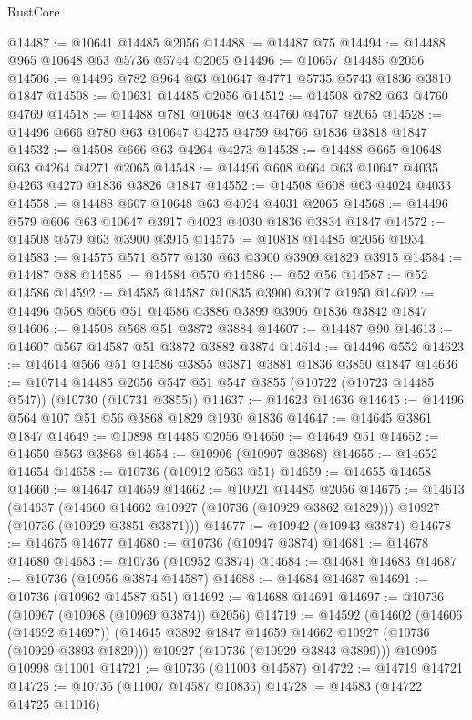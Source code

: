 \begin{lexlean}{RustCore}
\begin{coremodule}
@14487 := @10641 @14485 @2056
@14488 := @14487 @75
@14494 := @14488 @965 @10648 @63 @5736 @5744 @2065
@14496 := @10657 @14485 @2056
@14506 := @14496 @782 @964 @63 @10647 @4771 @5735 @5743 @1836 @3810 @1847
@14508 := @10631 @14485 @2056
@14512 := @14508 @782 @63 @4760 @4769
@14518 := @14488 @781 @10648 @63 @4760 @4767 @2065
@14528 := @14496 @666 @780 @63 @10647 @4275 @4759 @4766 @1836 @3818 @1847
@14532 := @14508 @666 @63 @4264 @4273
@14538 := @14488 @665 @10648 @63 @4264 @4271 @2065
@14548 := @14496 @608 @664 @63 @10647 @4035 @4263 @4270 @1836 @3826 @1847
@14552 := @14508 @608 @63 @4024 @4033
@14558 := @14488 @607 @10648 @63 @4024 @4031 @2065
@14568 := @14496 @579 @606 @63 @10647 @3917 @4023 @4030 @1836 @3834 @1847
@14572 := @14508 @579 @63 @3900 @3915
@14575 := @10818 @14485 @2056 @1934
@14583 := @14575 @571 @577 @130 @63 @3900 @3909 @1829 @3915
@14584 := @14487 @88
@14585 := @14584 @570
@14586 := @52 @56
@14587 := @52 @14586
@14592 := @14585 @14587 @10835 @3900 @3907 @1950
@14602 := @14496 @568 @566 @51 @14586 @3886 @3899 @3906 @1836 @3842 @1847
@14606 := @14508 @568 @51 @3872 @3884
@14607 := @14487 @90
@14613 := @14607 @567 @14587 @51 @3872 @3882 @3874
@14614 := @14496 @552
@14623 := @14614 @566 @51 @14586 @3855 @3871 @3881 @1836 @3850 @1847
@14636 := @10714
    @14485
    @2056
    @547
    @51
    @547
    @3855
    (@10722 (@10723 @14485 @547))
    (@10730 (@10731 @3855))
@14637 := @14623 @14636
@14645 := @14496 @564 @107 @51 @56 @3868 @1829 @1930 @1836
@14647 := @14645 @3861 @1847
@14649 := @10898 @14485 @2056
@14650 := @14649 @51
@14652 := @14650 @563 @3868
@14654 := @10906 (@10907 @3868)
@14655 := @14652 @14654
@14658 := @10736 (@10912 @563 @51)
@14659 := @14655 @14658
@14660 := @14647 @14659
@14662 := @10921 @14485 @2056
@14675 := @14613
    (@14637
      (@14660 @14662 @10927 (@10736 (@10929 @3862 @1829)))
      @10927
      (@10736 (@10929 @3851 @3871)))
@14677 := @10942 (@10943 @3874)
@14678 := @14675 @14677
@14680 := @10736 (@10947 @3874)
@14681 := @14678 @14680
@14683 := @10736 (@10952 @3874)
@14684 := @14681 @14683
@14687 := @10736 (@10956 @3874 @14587)
@14688 := @14684 @14687
@14691 := @10736 (@10962 @14587 @51)
@14692 := @14688 @14691
@14697 := @10736 (@10967 (@10968 (@10969 @3874)) @2056)
@14719 := @14592
    (@14602
      (@14606 (@14692 @14697))
      (@14645 @3892 @1847 @14659 @14662 @10927 (@10736 (@10929 @3893 @1829)))
      @10927
      (@10736 (@10929 @3843 @3899)))
    @10995
    @10998
    @11001
@14721 := @10736 (@11003 @14587)
@14722 := @14719 @14721
@14725 := @10736 (@11007 @14587 @10835)
@14728 := @14583 (@14722 @14725 @11016)

\end{coremodule}
\end{lexlean}
